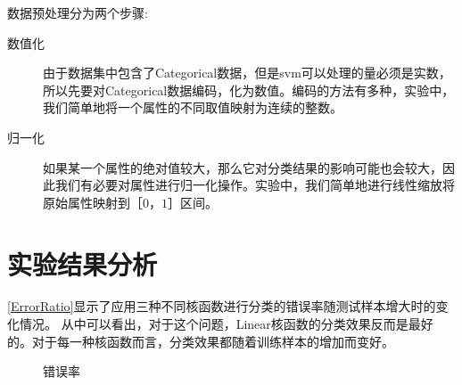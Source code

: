 \documentclass[a4paper]{article}
\begin{document}
数据预处理分为两个步骤:
\begin{description}
  \item [数值化] 由于数据集中包含了Categorical数据，但是svm可以处理的量必须是实数，所以先要对Categorical数据编码，化为数值。编码的方法有多种，实验中，我们简单地将一个属性的不同取值映射为连续的整数。
  \item [归一化] 如果某一个属性的绝对值较大，那么它对分类结果的影响可能也会较大，因此我们有必要对属性进行归一化操作。实验中，我们简单地进行线性缩放将原始属性映射到$［0，1］$区间。
\end{description}

\section{实验结果分析}
\autoref{ErrorRatio}显示了应用三种不同核函数进行分类的错误率随测试样本增大时的变化情况。
从中可以看出，对于这个问题，Linear核函数的分类效果反而是最好的。对于每一种核函数而言，分类效果都随着训练样本的增加而变好。
\begin{figure}[h]
  \centering
{}
  \caption{错误率}
  \label{ErrorRatio}
\end{figure}
\end{document}
